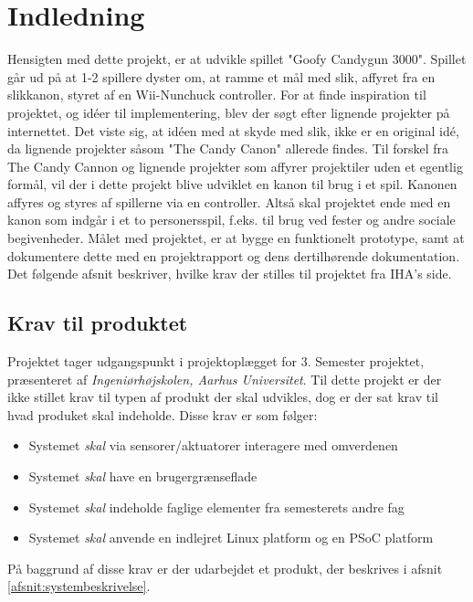 \chapter{Indledning}
Hensigten med dette projekt, er at udvikle spillet "Goofy Candygun 3000". Spillet går ud på at 1-2 spillere dyster om, at ramme et mål med slik, affyret fra en slikkanon, styret af en Wii-Nunchuck controller. For at finde inspiration til projektet, og idéer til implementering, blev der søgt efter lignende projekter på internettet. Det viste sig, at idéen med at skyde med slik, ikke er en original idé, da lignende projekter såsom "The Candy Canon" \cite{Website:CandyCanon} allerede findes. Til forskel fra The Candy Cannon og lignende projekter som affyrer projektiler uden et egentlig formål, vil der i dette projekt blive udviklet en kanon til brug i et spil. Kanonen affyres og styres af spillerne via en controller. Altså skal projektet ende med en kanon som indgår i et to personersspil, f.eks. til brug ved fester og andre sociale begivenheder.
Målet med projektet, er at bygge en funktionelt prototype, samt at dokumentere dette med en projektrapport og dens dertilhørende dokumentation. 
Det følgende afsnit beskriver, hvilke krav der stilles til projektet fra IHA's side.

\section{Krav til produktet}
Projektet tager udgangspunkt i projektoplægget for 3. Semester projektet, præsenteret af \textit{Ingeniørhøjskolen, Aarhus Universitet}. Til dette projekt er der ikke stillet krav til typen af produkt der skal udvikles, dog er der sat krav til hvad produket skal indeholde. Disse krav er som følger:


\begin{itemize}
	\item{Systemet \textit{skal} via sensorer/aktuatorer interagere med omverdenen}
	\item{Systemet \textit{skal} have en brugergrænseflade}
	\item{Systemet \textit{skal} indeholde faglige elementer fra semesterets andre fag}
	\item{Systemet \textit{skal} anvende en indlejret Linux platform og en PSoC platform}
\end{itemize}

\noindent På baggrund af disse krav er der udarbejdet et produkt, der beskrives i afsnit \ref{afsnit:systembeskrivelse}. \newline

